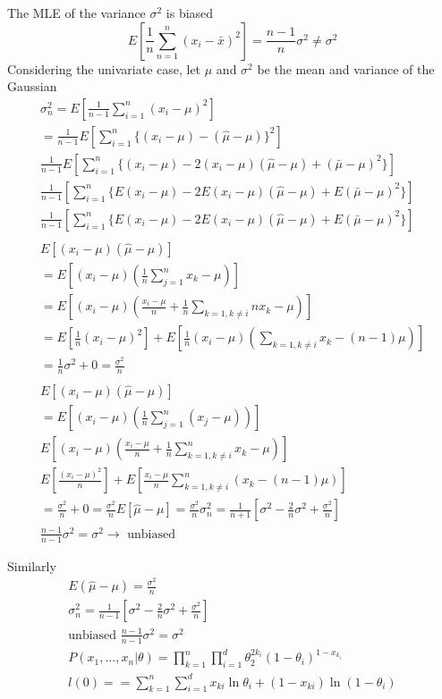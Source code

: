 \documentclass[11pt]{article}
\begin{document}
The MLE of the variance $\sigma^2$ is biased 
\begin{equation}
E [\frac{1}{n} \sum_{n=1}^n ( x_i - \bar{x})^2] = \frac{n-1}{n}\sigma^2 \neq \sigma^2
\end{equation}
Considering the univariate case, let $\mu$ and $\sigma^2$ be the mean and variance of the Gaussian 
\begin{eqnarray}
\sigma^2 _n = E [\frac{1}{n-1} \sum _{i=1}^n (x_i - \mu)^2] \\
 = \frac{1}{n-1} E [ \sum_{i=1}^n \{(x_i - \mu) - (\hat{\mu} - \mu)  \}^2] \\
\frac{1}{n-1} E [ \sum_{i=1}^n \{(x_i - \mu) -2 (x_i - \mu) (\hat{\mu} - \mu) + (\bar{\mu} - \mu)^2  \}]  \\
 \frac{1}{n-1}[ \sum_{i=1}^n \{E(x_i - \mu) -2 E(x_i - \mu) (\hat{\mu} - \mu) + E(\bar{\mu} - \mu)^2  \}] \\
 \frac{1}{n-1}[ \sum_{i=1}^n \{E(x_i - \mu) -2 E(x_i - \mu) (\hat{\mu} - \mu) + E(\bar{\mu} - \mu)^2  \}] \\
\\
E [(x_i - \mu)(\hat{\mu} - \mu)]  \\
= E [(x_i - \mu)(\frac{1}{n} \sum _{j=1}^n x_k - \mu )] \\
= E [ (x_i - \mu) (\frac{x_i - \mu}{n} + \frac{1}{n} \sum _{k=1, k \neq i} {n} x_k - \mu)] \\
= E [\frac{1}{n}(x_i - \mu)^2 ] + E [\frac{1}{n} (x_i - \mu)( \sum_{k=1, k\neq i} x_k - (n-1)\mu ) ]  \\
= \frac{1}{n}\sigma^2 + 0  =\frac{\sigma^2}{n}  \\
\\
E [ (x_i - \mu )(\hat{\mu} - \mu )] \\
= E[ (x_i - \mu) ( \frac{1}{n} \sum _{j=1}^n (x_j - \mu)  )] \\
E [ (x_i - \mu) ( \frac{x_i - \mu}{n} + \frac{1}{n} \sum _{k=1, k\neq i}^n x_k - \mu  ) ] \\
E [ \frac{ (x_i - \mu)^2 }{n}  ] + E [ \frac{ x_i - \mu }{n} \sum_{k=1, k\neq i} ^n (x_k - (n-1)\mu )] \\
= \frac{\sigma^2}{n} + 0 = \frac{\sigma^2}{n}
E [ \hat{\mu} - \mu ] = \frac{\sigma^2}{n}
\sigma_n ^2 = \frac{1}{n+1} [ \sigma^2 - \frac{2}{n} \sigma^2 + \frac{\sigma^2} {n}  ] \\
\frac{n-1}{n-1} \sigma^2 = \sigma^2 \to \textrm{ unbiased}
\end{eqnarray}

Similarly 
\begin{eqnarray}
	E (\hat{\mu} - \mu)  = \frac{\sigma^2} {n} \\
	\sigma_n ^2= \frac{1}{n-1} [\sigma^2 - \frac{2}{n}\sigma^2 + \frac{\sigma^2}{n}] \\
\textrm{unbiased }	\frac{n-1}{n-1} \sigma^2 = \sigma^2   \\
P(x_1, ..., x_n | \theta)  = \prod _{k=1}^n \prod _{i=1}^d \theta_2 ^{2k_i} ( 1- \theta_i)^{1-x_{k_i}} \\
l(0 ) == \sum_{k=1}^n \sum _{i=1}^d x_{ki} \ln \theta_i + ( 1 - x_{ki}) \ln(1 -\theta_i) 
\end{eqnarray}
\end{document}

